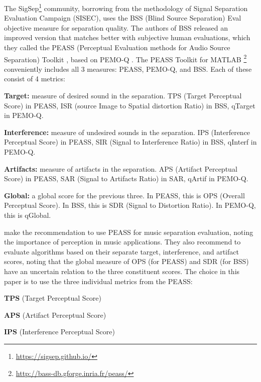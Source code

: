 \documentclass[letter,12pt]{article}
\newenvironment{tight_enumerate}{
\begin{enumerate}
  \setlength{\itemsep}{0pt}
  \setlength{\parskip}{0pt}
}{\end{enumerate}}
\newenvironment{tight_itemize}{
\begin{itemize}
  \setlength{\itemsep}{0pt}
  \setlength{\parskip}{0pt}
}{\end{itemize}}
\begin{document}
The SigSep\footnote{\url{https://sigsep.github.io/}} community, borrowing from the methodology of Signal Separation Evaluation Campaign (SISEC), uses the BSS (Blind Source Separation) Eval \cite{bss} objective measure for separation quality. The authors of BSS released an improved version that matches better with subjective human evaluations, which they called the PEASS (Perceptual Evaluation methods for Audio Source Separation) Toolkit \cite{peass}, based on PEMO-Q \cite{pemoq}. The PEASS Toolkit for MATLAB \footnote{\url{http://bass-db.gforge.inria.fr/peass/}} conveniently includes all 3 measures: PEASS, PEMO-Q, and BSS. Each of these consist of 4 metrics:

\begin{tight_itemize}
\item
	\textbf{Target:} measure of desired sound in the separation. TPS (Target Perceptual Score) in PEASS, ISR (source Image to Spatial distortion Ratio) in BSS, qTarget in PEMO-Q.
\item
	\textbf{Interference:} measure of undesired sounds in the separation. IPS (Interference Perceptual Score) in PEASS, SIR (Signal to Interference Ratio) in BSS, qInterf in PEMO-Q.
\item
	\textbf{Artifacts:} measure of artifacts in the separation. APS (Artifact Perceptual Score) in PEASS, SAR (Signal to Artifacts Ratio) in SAR, qArtif in PEMO-Q.
\item
	\textbf{Global:} a global score for the previous three. In PEASS, this is OPS (Overall Perceptual Score). In BSS, this is SDR (Signal to Distortion Ratio). In PEMO-Q, this is qGlobal.
\end{tight_itemize}

\citet{beassvpeass} make the recommendation to use PEASS for music separation evaluation, noting the importance of perception in music applications. They also recommend to evaluate algorithms based on their separate target, interference, and artifact scores, noting that the global measure of OPS (for PEASS) and SDR (for BSS) have an uncertain relation to the three constituent scores. The choice in this paper is to use the three individual metrics from the PEASS:
\begin{tight_enumerate}
	\item
		\textbf{TPS} (Target Perceptual Score)
	\item
		\textbf{APS} (Artifact Perceptual Score)
	\item
		\textbf{IPS} (Interference Perceptual Score)
\end{tight_enumerate}
\end{document}
